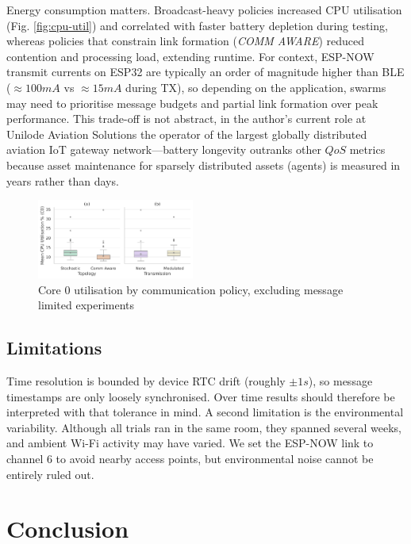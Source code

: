 \documentclass[conference]{IEEEtran}
\begin{document}
Energy consumption matters. Broadcast-heavy policies increased CPU utilisation (Fig. \ref{fig:cpu-util}) and correlated with faster battery depletion during testing, whereas policies that constrain link formation (\emph{COMM AWARE}) reduced contention and processing load, extending runtime. For context, ESP-NOW transmit currents on ESP32 are typically an order of magnitude higher than BLE ($\approx100mA$ vs $\approx15mA$ during TX), so depending on the application, swarms may need to prioritise message budgets and partial link formation over peak performance. This trade-off is not abstract, in the author's current role at Unilode Aviation Solutions the operator of the largest globally distributed aviation IoT gateway network—battery longevity outranks other $QoS$ metrics because asset maintenance for sparsely distributed assets (agents) is measured in years rather than days.\\

\begin{figure}[H]
    \centering
    \includegraphics[width=0.46\textwidth]{cpu_util.pdf}
    \caption{Core 0 utilisation by communication policy, excluding message limited experiments}
    \label{fig:cpu_util}
\end{figure}

\subsection{Limitations}

Time resolution is bounded by device RTC drift (roughly $\pm1s$), so message timestamps are only loosely synchronised. Over time results should therefore be interpreted with that tolerance in mind. A second limitation is the environmental variability. Although all trials ran in the same room, they spanned several weeks, and ambient Wi-Fi activity may have varied. We set the ESP-NOW link to channel 6 to avoid nearby access points, but environmental noise cannot be entirely ruled out.

\section{Conclusion}
\end{document}
